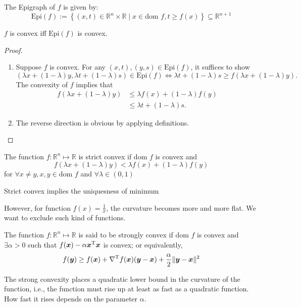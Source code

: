 \begin{definition}[Epigraph]
The Epigraph of $f$ is given by:
\[
\mbox{Epi}(f):=\left\{
(x,t)\in\mathbb{R}^{n}\times\mathbb{R}\mid
x\in\mbox{dom }f,
t\ge f(x)
\right\}\subseteq\mathbb{R}^{n+1}
\]
\end{definition}
\begin{theorem}
$f$ is convex iff $\mbox{Epi}(f)$ is convex.
\end{theorem}
\begin{proof}
\begin{enumerate}
\item
Suppose $f$ is convex. For any $(x,t),(y,s)\in \mbox{Epi}(f)$, it suffices to show
\[
(\lambda x+(1-\lambda)y, \lambda t+(1-\lambda)s)\in \mbox{Epi}(f)\Longleftrightarrow
\lambda t+(1-\lambda)s\ge f(\lambda x+(1-\lambda)y).
\]
The convexity of $f$ implies that
\begin{align*}
f(\lambda x+(1-\lambda)y)&\le \lambda f(x)+ (1-\lambda)f(y)\\
&\le \lambda t + (1-\lambda)s.
\end{align*}
\item
The reverse direction is obvious by applying definitions.
\end{enumerate}
\end{proof}

\begin{definition}
The function $f:\mathbb{R}^n\mapsto\mathbb{R}$ is strict convex if $\mbox{dom }f$ is convex and
\[
f(\lambda x+ (1-\lambda)y)<\lambda f(x) + (1-\lambda) f(y)
\]
for $\forall x\ne y, x,y\in\mbox{dom }f$ and $\forall \lambda\in(0,1)$
\end{definition}
\begin{remark}
Strict convex implies the uniquesness of minimum
\end{remark}
However, for function $f(x)=\frac{1}{x}$, the curvature becomes more and more flat. We want to exclude such kind of functions.
\begin{definition}
The function $f:\mathbb{R}^n\mapsto\mathbb{R}$ is said to be strongly convex if $\mbox{dom }f$ is convex and $\exists\alpha>0$ such that $f(\bm x) - \alpha\bm x^{\mathrm T}\bm x$ is convex; or equivalently,
\[
f(\bm y)\ge f(\bm x) + \nabla^{\mathrm T} f(\bm x)(\bm y-\bm x) + \frac{\alpha}{2}\|\bm y-\bm x\|^2
\]
\end{definition}
\begin{remark}
The strong convexity places a quadratic lower bound in the curvature of the function, i.e., the function must rise up at least as fast as a quadratic function. How fast it rises depends on the parameter $\alpha$.
\end{remark}

